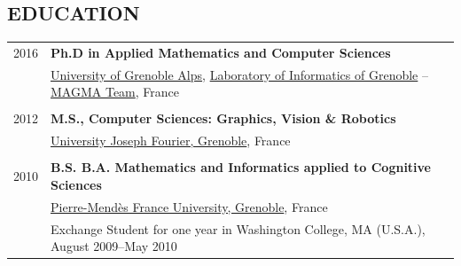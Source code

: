 
\subsection{EDUCATION}
\vspace{2pt}

\noindent
\begin{tabularx}{\textwidth}{@{}lX@{}}
2016 & \textbf{Ph.D in Applied Mathematics and Computer Sciences} \\
     & \href{http://www.univ-grenoble-alpes.fr/}{University of Grenoble Alps}, \href{http://liglab.fr}{Laboratory of Informatics of Grenoble} -- \href{http://magma.imag.fr}{MAGMA Team}, France \\
     \\[3pt]
2012 & \textbf{M.S., Computer Sciences: Graphics, Vision \& Robotics} \\
     & \href{https://www.ujf-grenoble.fr/?language=en}{University Joseph Fourier, Grenoble}, France \\
     \\[3pt]
2010 & \textbf{B.S. B.A. Mathematics and Informatics applied to Cognitive Sciences} \\
     & \href{http://www.upmf-grenoble.fr/}{Pierre-Mendès France University, Grenoble}, France \\
     & Exchange Student for one year in Washington College, MA (U.S.A.), August 2009--May 2010 \\
\end{tabularx}

